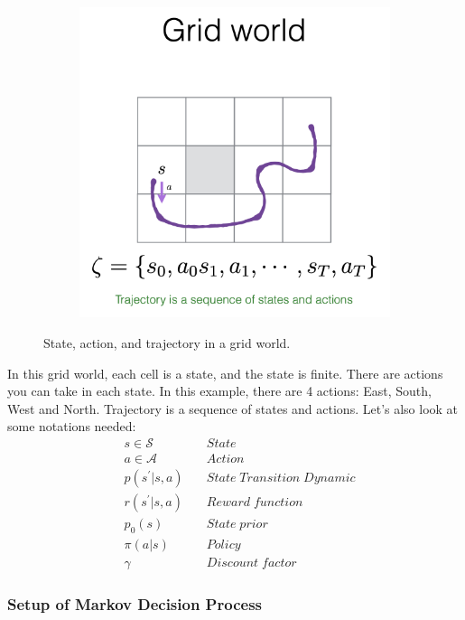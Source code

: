 \documentclass[11pt]{article}
\begin{document}
\begin{figure}[H]
\begin{subfigure}{0.3\linewidth}
     \end{subfigure}%
     \begin{subfigure}{0.3\linewidth}
         \includegraphics[width=\linewidth]{images/trajectory.png}
     \end{subfigure}%
    \label{fig:grid_world}
    \caption{State, action, and trajectory in a grid world.}
\end{figure}
In this grid world, each cell is a state, and the state is finite. There are actions you can take in each state. In this example, there are 4 actions: East, South, West and North. Trajectory is a sequence of states and actions.
Let's also look at some notations needed:
\begin{align*}
    & s \in \mathcal{S}  &\quad State \\
    & a \in \mathcal{A}  &\quad Action \\
    & p(s^{'} |s, a) &\quad State\; Transition\; Dynamic \\
    & r(s^{'} |s, a) &\quad Reward\; function \\
    & p_0(s) &\quad State\;prior \\
    & \pi (a|s) &\quad Policy \\
    & \gamma &\quad Discount\; factor
\end{align*}

\subsubsection{Setup of Markov Decision Process}
\end{document}
